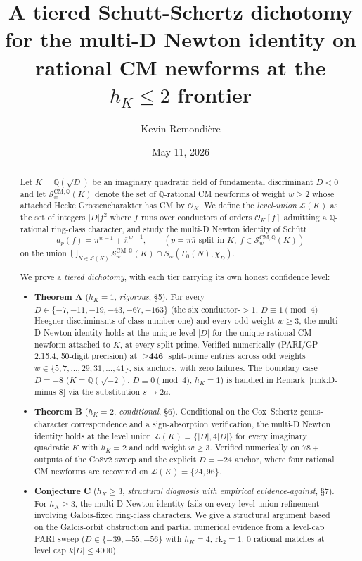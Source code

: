\documentclass[11pt,a4paper]{amsart}
\title[A tiered Schutt-Schertz dichotomy for the multi-D Newton identity]{A tiered Schutt-Schertz dichotomy for the multi-D Newton identity on rational CM newforms at the $h_K \le 2$ frontier}
\author{Kevin Remondi\`ere}
\date{May 11, 2026}
\theoremstyle{definition}
\newcommand{\Q}{\mathbb{Q}}
\newcommand{\OK}{\mathcal{O}_K}
\newcommand{\Lcal}{\mathcal{L}}
\newcommand{\Scal}{\mathcal{S}}
\newcommand{\hK}{h_{K}}
\begin{document}
\begin{abstract}
Let $K = \Q(\sqrt{D})$ be an imaginary quadratic field of fundamental discriminant $D < 0$ and let $\Scal_w^{\mathrm{CM},\Q}(K)$ denote the set of $\Q$-rational CM newforms of weight $w \ge 2$ whose attached Hecke Gr\"ossencharakter has CM by $\OK$. We define the \emph{level-union} $\Lcal(K)$ as the set of integers $|D| f^2$ where $f$ runs over conductors of orders $\OK[f]$ admitting a $\Q$-rational ring-class character, and study the multi-D Newton identity of Sch\"utt
\[
a_p(f) = \pi^{w-1} + \bar\pi^{w-1}, \qquad (p = \pi\bar\pi \text{ split in } K, \ f \in \Scal_w^{\mathrm{CM},\Q}(K))
\]
on the union $\bigcup_{N \in \Lcal(K)} \Scal_w^{\mathrm{CM},\Q}(K) \cap S_w(\Gamma_0(N), \chi_D)$.

We prove a \emph{tiered dichotomy}, with each tier carrying its own honest confidence level:

\begin{itemize}[leftmargin=2em]
  \item \textbf{Theorem A} ($\hK = 1$, \emph{rigorous}, \S5). For every $D \in \{-7,-11,-19,-43,-67,-163\}$ (the six conductor-${>}1$, $D \equiv 1 \pmod 4$ Heegner discriminants of class number one) and every odd weight $w \ge 3$, the multi-D Newton identity holds at the unique level $|D|$ for the unique rational CM newform attached to $K$, at every split prime. Verified numerically (PARI/GP 2.15.4, 50-digit precision) at $\ge \textbf{446}$ split-prime entries across odd weights $w \in \{5,7,\ldots,29,31,\ldots,41\}$, six anchors, with zero failures. The boundary case $D = -8$ ($K = \Q(\sqrt{-2})$, $D \equiv 0 \pmod 4$, $\hK = 1$) is handled in Remark~\ref{rmk:D-minus-8} via the substitution $s \to 2a$.
  \item \textbf{Theorem B} ($\hK = 2$, \emph{conditional}, \S6). Conditional on the Cox--Schertz genus-character correspondence and a sign-absorption verification, the multi-D Newton identity holds at the level union $\Lcal(K) = \{|D|, 4|D|\}$ for every imaginary quadratic $K$ with $\hK = 2$ and odd weight $w \ge 3$. Verified numerically on $78+$ outputs of the Co8v2 sweep and the explicit $D = -24$ anchor, where four rational CM newforms are recovered on $\Lcal(K) = \{24, 96\}$.
  \item \textbf{Conjecture C} ($\hK \ge 3$, \emph{structural diagnosis with empirical evidence-against}, \S7). For $\hK \ge 3$, the multi-D Newton identity fails on every level-union refinement involving Galois-fixed ring-class characters. We give a structural argument based on the Galois-orbit obstruction and partial numerical evidence from a level-cap PARI sweep ($D \in \{-39,-55,-56\}$ with $\hK = 4$, $\mathrm{rk}_2 = 1$: $0$ rational matches at level cap $k|D| \le 4000$).
\end{itemize}


\end{abstract}
\end{document}
